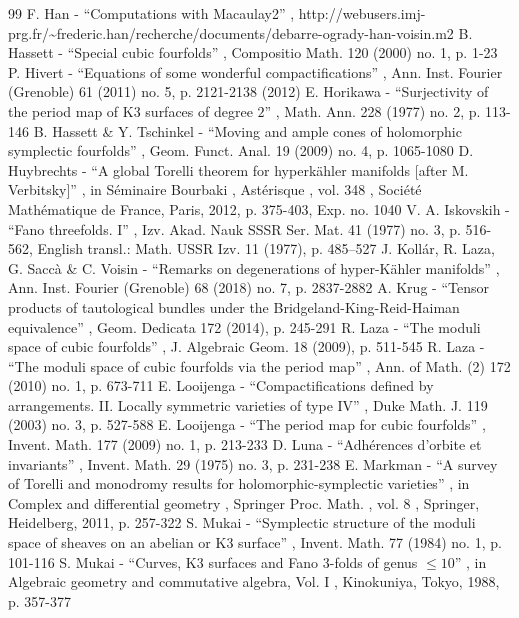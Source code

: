 \documentclass[11pt]{article}
\theoremstyle{definition}
\begin{document}
\begin{thebibliography}{99}
 F. Han - “Computations with Macaulay2” , http://webusers.imj-prg.fr/\textasciitilde{}frederic.han/recherche/documents/debarre-ogrady-han-voisin.m2
 B. Hassett - “Special cubic fourfolds” , Compositio Math. 120 (2000) no. 1, p. 1-23
 P. Hivert - “Equations of some wonderful compactifications” , Ann. Inst. Fourier (Grenoble) 61 (2011) no. 5, p. 2121-2138 (2012)
 E. Horikawa - “Surjectivity of the period map of K3 surfaces of degree $2$” , Math. Ann. 228 (1977) no. 2, p. 113-146
 B. Hassett \& Y. Tschinkel - “Moving and ample cones of holomorphic symplectic fourfolds” , Geom. Funct. Anal. 19 (2009) no. 4, p. 1065-1080
 D. Huybrechts - “A global Torelli theorem for hyperkähler manifolds [after M. Verbitsky]” , in Séminaire Bourbaki , Astérisque , vol. 348 , Société Mathématique de France, Paris, 2012, p. 375-403, Exp. no. 1040
 V. A. Iskovskih - “Fano threefolds. I” , Izv. Akad. Nauk SSSR Ser. Mat. 41 (1977) no. 3, p. 516-562, English transl.: Math. USSR Izv. 11 (1977), p. 485–527
 J. Kollár, R. Laza, G. Saccà \& C. Voisin - “Remarks on degenerations of hyper-Kähler manifolds” , Ann. Inst. Fourier (Grenoble) 68 (2018) no. 7, p. 2837-2882
 A. Krug - “Tensor products of tautological bundles under the Bridgeland-King-Reid-Haiman equivalence” , Geom. Dedicata 172 (2014), p. 245-291
 R. Laza - “The moduli space of cubic fourfolds” , J. Algebraic Geom. 18 (2009), p. 511-545
 R. Laza - “The moduli space of cubic fourfolds via the period map” , Ann. of Math. (2) 172 (2010) no. 1, p. 673-711
 E. Looijenga - “Compactifications defined by arrangements. II. Locally symmetric varieties of type IV” , Duke Math. J. 119 (2003) no. 3, p. 527-588
 E. Looijenga - “The period map for cubic fourfolds” , Invent. Math. 177 (2009) no. 1, p. 213-233
 D. Luna - “Adhérences d’orbite et invariants” , Invent. Math. 29 (1975) no. 3, p. 231-238
 E. Markman - “A survey of Torelli and monodromy results for holomorphic-symplectic varieties” , in Complex and differential geometry , Springer Proc. Math. , vol. 8 , Springer, Heidelberg, 2011, p. 257-322
 S. Mukai - “Symplectic structure of the moduli space of sheaves on an abelian or K3 surface” , Invent. Math. 77 (1984) no. 1, p. 101-116
 S. Mukai - “Curves, K3 surfaces and Fano $3$-folds of genus $\le 10$” , in Algebraic geometry and commutative algebra, Vol. I , Kinokuniya, Tokyo, 1988, p. 357-377

\end{thebibliography}
\end{document}
